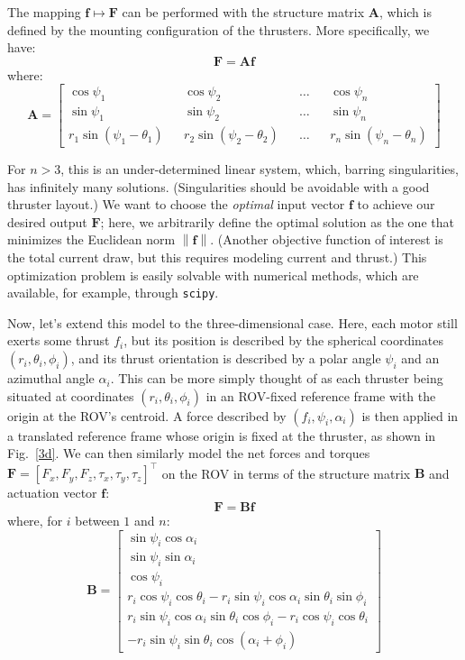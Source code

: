 \documentclass{article}
\renewcommand{\vec}[1]{\mathbf{#1}}
\newcommand{\norm}[1]{\left\lVert#1\right\rVert}
\newcommand{\trans}[1]{#1^\intercal}
\begin{document}
The mapping $\vec{f} \mapsto \vec{F}$ can be performed with the structure matrix $\vec{A}$, which is defined by the mounting configuration of the thrusters. More specifically, we have:
\begin{equation}
  \vec{F} = \vec{A}\vec{f}
\end{equation}
where:
\begin{equation}
  \vec{A} =
  \begin{bmatrix}
    \cos\psi_1 && \cos\psi_2 && \dots && \cos\psi_n \\
    \sin\psi_1 && \sin\psi_2 && \dots && \sin\psi_n \\
    r_1\sin(\psi_1 - \theta_1) && r_2\sin(\psi_2 - \theta_2) && \dots && r_n\sin(\psi_n - \theta_n)
  \end{bmatrix}
\end{equation}

For $n > 3$, this is an under-determined linear system, which, barring singularities, has infinitely many solutions. (Singularities should be avoidable with a good thruster layout.) We want to choose the \emph{optimal} input vector $\vec{f}$ to achieve our desired output $\vec{F}$; here, we arbitrarily define the optimal solution as the one that minimizes the Euclidean norm $\norm{\vec{f}}$. (Another objective function of interest is the total current draw, but this requires modeling current and thrust.) This optimization problem is easily solvable with numerical methods, which are available, for example, through \verb|scipy|.

Now, let's extend this model to the three-dimensional case. Here, each motor still exerts some thrust $f_i$, but its position is described by the spherical coordinates $(r_i, \theta_i, \phi_i)$, and its thrust orientation is described by a polar angle $\psi_i$ and an azimuthal angle $\alpha_i$. This can be more simply thought of as each thruster being situated at coordinates $(r_i, \theta_i, \phi_i)$ in an ROV-fixed reference frame with the origin at the ROV's centroid. A force described by $(f_i, \psi_i, \alpha_i)$ is then applied in a translated reference frame whose origin is fixed at the thruster, as shown in Fig.~\ref{3d}. We can then similarly model the net forces and torques $\vec{F} = \trans{[F_x, F_y, F_z, \tau_x, \tau_y, \tau_z]}$ on the ROV in terms of the structure matrix $\vec{B}$ and actuation vector $\vec{f}$:
\begin{equation}
  \vec{F} = \vec{B}\vec{f}
\end{equation}
where, for $i$ between $1$ and $n$:
\begin{equation}
  \vec{B} =
  \begin{bmatrix}
    \sin\psi_i\cos\alpha_i \\
    \sin\psi_i\sin\alpha_i \\
    \cos\psi_i \\
    r_i\cos\psi_i\cos\theta_i - r_i\sin\psi_i\cos\alpha_i\sin\theta_i\sin\phi_i \\
    r_i\sin\psi_i\cos\alpha_i\sin\theta_i\cos\phi_i - r_i\cos\psi_i\cos\theta_i \\
    -r_i\sin\psi_i\sin\theta_i\cos(\alpha_i+\phi_i)
  \end{bmatrix}
\end{equation}
\end{document}
